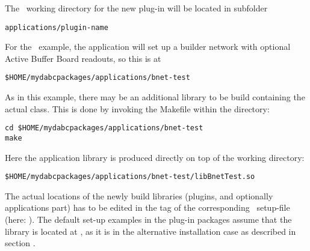 \item The \dabc\ working directory for the new plug-in will be located in
subfolder 
\begin{verbatim}
applications/plugin-name 
\end{verbatim}
For the \ABB\ example, the application
will set up a builder network with optional Active Buffer Board readouts, so this
is at
\begin{verbatim}
$HOME/mydabcpackages/applications/bnet-test
\end{verbatim}
As in this example, there may be an additional library to be build containing the actual
 class. This is done by invoking the Makefile within the directory:
\begin{verbatim}
cd $HOME/mydabcpackages/applications/bnet-test
make
\end{verbatim}
Here the application library is produced directly on top of the working directory: 
\begin{verbatim}
$HOME/mydabcpackages/applications/bnet-test/libBnetTest.so
\end{verbatim}

\item The actual locations of the newly build libraries (plugins, and optionally applications part) has to be edited in the 
 tag of the corresponding \dabc\ setup-file (here: ).
The default set-up examples in the plug-in packages assume that the library is located
at , as it is in the alternative installation case as described in
section .

\enum


